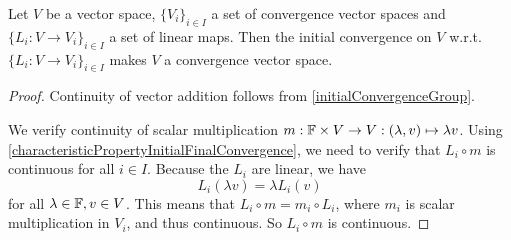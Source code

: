 \begin{proposition}
Let $V$ be a vector space, $\{V_i\}_{i\in I}$ a set of convergence vector spaces and $\{L_i: V \to V_i\}_{i\in I}$ a set of linear maps. Then the initial convergence on $V$ w.r.t. $\{L_i: V \to V_i\}_{i\in I}$ makes $V$ a convergence vector space.
\end{proposition}
\begin{proof}
Continuity of vector addition follows from \ref{initialConvergenceGroup}.

We verify continuity of scalar multiplication $m: \mathbb{F}\times V \to V: (\lambda, v) \mapsto \lambda v$. Using \ref{characteristicPropertyInitialFinalConvergence}, we need to verify that $L_i\circ m$ is continuous for all $i\in I$. Because the $L_i$ are linear, we have
\[ L_i(\lambda v) = \lambda L_i(v) \]
for all $\lambda \in \mathbb{F}, v \in V$. This means that $L_i\circ m = m_i \circ L_i$, where $m_i$ is scalar multiplication in $V_i$, and thus continuous. So $L_i \circ m$ is continuous.
\end{proof}

